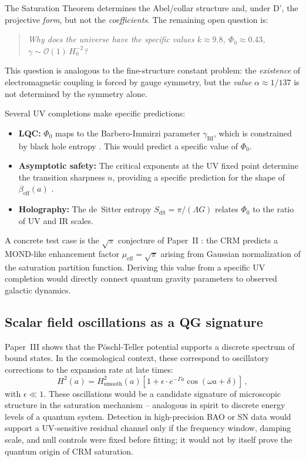 \documentclass[aps,prd,twocolumn,superscriptaddress,nofootinbib]{revtex4-2}
\begin{document}
The Saturation Theorem determines the Abel/collar structure and, under D', the projective \textit{form}, but not the \textit{coefficients}. The remaining open question is:

\begin{quote}
\textit{Why does the universe have the specific values $k \approx 9.8$, $\Phi_0 \approx 0.43$, $\gamma \sim \mathcal{O}(1)\,H_0^{-2}$?}
\end{quote}

This question is analogous to the fine-structure constant problem: the \textit{existence} of electromagnetic coupling is forced by gauge symmetry, but the \textit{value} $\alpha \approx 1/137$ is not determined by the symmetry alone.

Several UV completions make specific predictions:
\begin{itemize}
\item \textbf{LQC:} $\Phi_0$ maps to the Barbero-Immirzi parameter $\gamma_{\mathrm{BI}}$, which is constrained by black hole entropy \cite{Meissner2004}. This would predict a specific value of $\Phi_0$.
\item \textbf{Asymptotic safety:} The critical exponents at the UV fixed point determine the transition sharpness $n$, providing a specific prediction for the shape of $\beta_{\mathrm{eff}}(a)$ \cite{Reuter1998}.
\item \textbf{Holography:} The de~Sitter entropy $S_{\mathrm{dS}} = \pi/(\Lambda G)$ relates $\Phi_0$ to the ratio of UV and IR scales.
\end{itemize}

A concrete test case is the $\sqrt{\pi}$ conjecture of Paper~II \cite{Geiger2026b}: the CRM predicts a MOND-like enhancement factor $\mu_{\mathrm{eff}} = \sqrt{\pi}$ arising from Gaussian normalization of the saturation partition function. Deriving this value from a specific UV completion would directly connect quantum gravity parameters to observed galactic dynamics.

\subsection{Scalar field oscillations as a QG signature}

Paper~III \cite{Geiger2026c} shows that the P\"oschl-Teller potential supports a discrete spectrum of bound states. In the cosmological context, these correspond to oscillatory corrections to the expansion rate at late times:
\begin{equation}
H^2(a) = H_{\mathrm{smooth}}^2(a)\left[1 + \epsilon \cdot e^{-\Gamma a} \cos(\omega a + \delta)\right]\,,
\end{equation}
with $\epsilon \ll 1$. These oscillations would be a candidate signature of microscopic structure in the saturation mechanism -- analogous in spirit to discrete energy levels of a quantum system. Detection in high-precision BAO or SN data would support a UV-sensitive residual channel only if the frequency window, damping scale, and null controls were fixed before fitting; it would not by itself prove the quantum origin of CRM saturation.
\end{document}
